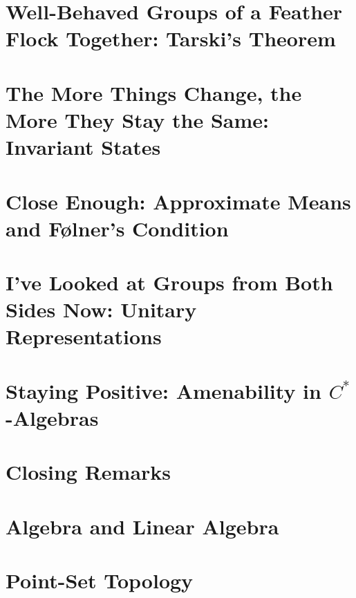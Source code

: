 \documentclass[11pt]{package2}
\begin{document}
\chapter{Well-Behaved Groups of a Feather Flock Together: Tarski's Theorem}\label{ch:tarskis_theorem}

\chapter{The More Things Change, the More They Stay the Same: Invariant States}\label{ch:invariant_states}

\chapter{Close Enough: Approximate Means and Følner's Condition}\label{ch:folner_condition}

\chapter{I've Looked at Groups from Both Sides Now: Unitary Representations}\label{ch:left_regular_representation}

\chapter{Staying Positive: Amenability in \texorpdfstring{$C^{\ast}$-Algebras}{C*-Algebras}}\label{ch:nuclearity}

\chapter{Closing Remarks}

\appendix
\chapter{Algebra and Linear Algebra}\label{ch:algebra_and_linear_algebra}

\chapter{Point-Set Topology}\label{ch:point_set_topology}

\end{document}
